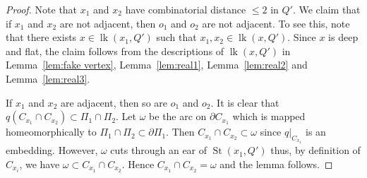 \documentclass[11pt]{amsart}
\newcommand{\lk}{\operatorname{lk}}
\newcommand{\St}{\operatorname{St}}
\theoremstyle{definition}
\begin{document}
\begin{proof}
Note that $x_1$ and $x_2$ have combinatorial distance $\le 2$ in $Q'$. We claim that if $x_1$ and $x_2$ are not adjacent, then $o_1$ and $o_2$ are not adjacent. To see this, note that there exists $x\in\lk(x_1,Q')$ such that $x_1,x_2\in\lk(x,Q')$. Since $x$ is deep and flat, the claim follows from the descriptions of $\lk(x,Q')$ in Lemma~\ref{lem:fake vertex}, Lemma~\ref{lem:real1}, Lemma~\ref{lem:real2} and Lemma~\ref{lem:real3}.
	
	
	
If $x_1$ and $x_2$ are adjacent, then so are $o_1$ and $o_2$. It is clear that $q(C_{x_1}\cap C_{x_2})\subset\Pi_1\cap\Pi_2$. Let $\omega$ be the arc on $\partial C_{x_1}$ which is mapped homeomorphically to $\Pi_1\cap\Pi_2\subset\partial \Pi_1$. Then $C_{x_1}\cap C_{x_2}\subset\omega$ since $q|_{C_{x_1}}$ is an embedding. However, $\omega$ cuts through an ear of $\St(x_1,Q')$ thus, by definition of $C_{x_i}$, we have $\omega\subset C_{x_1}\cap C_{x_2}$. Hence $C_{x_1}\cap C_{x_2}=\omega$ and the lemma follows.


\end{proof}
\end{document}
